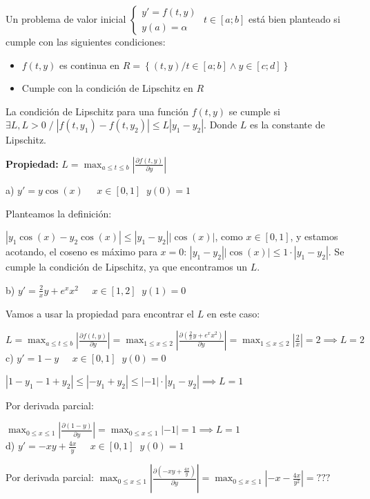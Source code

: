 \documentclass[11pt]{article}
\begin{document}
	Un problema de valor inicial $\begin{cases}
		y'=f(t,y) \\
		y(a)=\alpha
	\end{cases}$ $t \in [a;b]$ está bien planteado si cumple con las siguientes condiciones:
	\begin{itemize}
		\item $f(t,y)$ es continua en $R=\left\lbrace(t,y) / t \in [a;b] \wedge y \in [c;d]\right\rbrace$
		\item Cumple con la condición de Lipschitz en $R$
	\end{itemize}

	La condición de Lipschitz para una función $f(t,y)$ se cumple si $\exists L  ,L>0 \; / \; |f(t,y_1)-f(t,y_2)|\le L|y_1-y_2|$. Donde $L$ es la constante de Lipschitz.
	
	\textbf{Propiedad:} $\displaystyle L=\max_{a\le t \le b} \left|\frac{\partial f(t,y)}{\partial y}\right|$
	
	a) $y'=y\cos(x) \;\;\;\;\; x\in[0,1] \;\; y(0)=1$
	
	Planteamos la definición:
	
	$|y_1\cos(x)-y_2\cos(x)|\le |y_1-y_2||\cos(x)|$, como $x \in [0,1]$, y estamos acotando, el coseno es máximo para $x=0$: $|y_1-y_2||\cos(x)| \le 1\cdot |y_1-y_2|$. Se cumple la condición de Lipschitz, ya que encontramos un $L$.
	
	b) $y'=\frac{2}{x}y+e^xx^2 \;\;\;\;\; x\in[1,2] \;\; y(1)=0$
	
	Vamos a usar la propiedad para encontrar el $L$ en este caso:
	
	$\displaystyle L=\max_{a\le t \le b} \left|\frac{\partial f(t,y)}{\partial y}\right|=\displaystyle \max_{1\le x \le 2} \left|\frac{\partial ( \frac{2}{x}y+e^xx^2)}{\partial y}\right|=\max_{1\le x \le 2} \left|\frac{2}{x}\right|=2 \implies L=2$\\
	
	c) $y'=1-y \;\;\;\;\; x\in[0,1] \;\; y(0)=0$
	
	$|1-y_1-1+y_2|\le |-y_1+y_2|\le |-1|\cdot |y_1-y_2| \implies L=1$
	
	Por derivada parcial:
	
	$\displaystyle \max_{0\le x \le 1} \left|\frac{\partial (1-y)}{\partial y}\right|=\max_{0\le x \le 1} |-1|=1 \implies L=1$\\
	
	d) $y'=-xy+\frac{4x}{y} \;\;\;\;\; x\in[0,1] \;\; y(0)=1$
	
	Por derivada parcial:
	$\displaystyle \max_{0\le x \le 1} \left|\frac{\partial ( -xy+\frac{4x}{y})}{\partial y}\right|=\max_{0 \le x \le 1} \left|-x-\frac{4x}{y^2}\right|=???$
	
\end{document}
